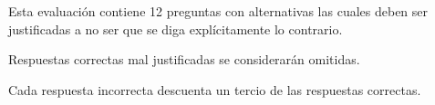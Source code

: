 \vspace{0.05\textwidth}

Esta evaluaci\'on contiene 12 preguntas con alternativas las cuales deben ser justificadas a no ser que se diga expl\'icitamente lo contrario.

Respuestas correctas mal justificadas se considerar\'an omitidas.

Cada respuesta incorrecta descuenta un tercio de las respuestas correctas.